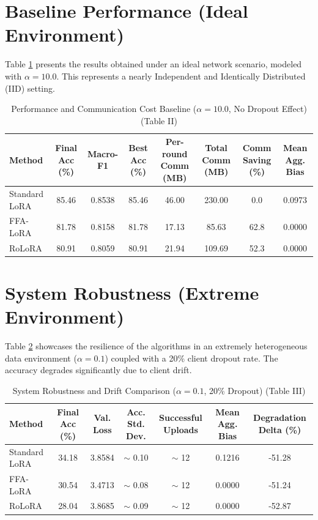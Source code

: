 \documentclass[journal]{IEEEtran}
\begin{document}
\section{Baseline Performance (Ideal Environment)}
Table \ref{tab:ideal} presents the results obtained under an ideal network scenario, modeled with $\alpha = 10.0$. This represents a nearly Independent and Identically Distributed (IID) setting.

\begin{table}[t!]
\centering
\caption{Performance and Communication Cost Baseline ($\alpha = 10.0$, No Dropout Effect) (Table II)}
\label{tab:ideal}
\begin{tabular}{l c c c c c c c}
\toprule
\textbf{Method} & \textbf{Final Acc (\%)} & \textbf{Macro-F1} & \textbf{Best Acc (\%)} & \textbf{Per-round Comm (MB)} & \textbf{Total Comm (MB)} & \textbf{Comm Saving (\%)} & \textbf{Mean Agg. Bias} \\
\midrule
Standard LoRA & 85.46 & 0.8538 & 85.46 & 46.00 & 230.00 & 0.0 & 0.0973 \\
FFA-LoRA      & 81.78 & 0.8158 & 81.78 & 17.13 & 85.63 & 62.8 & 0.0000 \\
RoLoRA        & 80.91 & 0.8059 & 80.91 & 21.94 & 109.69 & 52.3 & 0.0000 \\
\bottomrule
\end{tabular}
\end{table}

\section{System Robustness (Extreme Environment)}
Table \ref{tab:extreme} showcases the resilience of the algorithms in an extremely heterogeneous data environment ($\alpha = 0.1$) coupled with a 20\% client dropout rate. The accuracy degrades significantly due to client drift.

\begin{table}[t!]
\centering
\caption{System Robustness and Drift Comparison ($\alpha = 0.1$, 20\% Dropout) (Table III)}
\label{tab:extreme}
\begin{tabular}{l c c c c c c}
\toprule
\textbf{Method} & \textbf{Final Acc (\%)} & \textbf{Val. Loss} & \textbf{Acc. Std. Dev.} & \textbf{Successful Uploads} & \textbf{Mean Agg. Bias} & \textbf{Degradation Delta (\%)} \\
\midrule
Standard LoRA & 34.18 & 3.8584 & $\sim$ 0.10 & $\sim$ 12 & 0.1216 & -51.28 \\
FFA-LoRA      & 30.54 & 3.4713 & $\sim$ 0.08 & $\sim$ 12 & 0.0000 & -51.24 \\
RoLoRA        & 28.04 & 3.8685 & $\sim$ 0.09 & $\sim$ 12 & 0.0000 & -52.87 \\
\bottomrule
\end{tabular}
\end{table}
\end{document}
